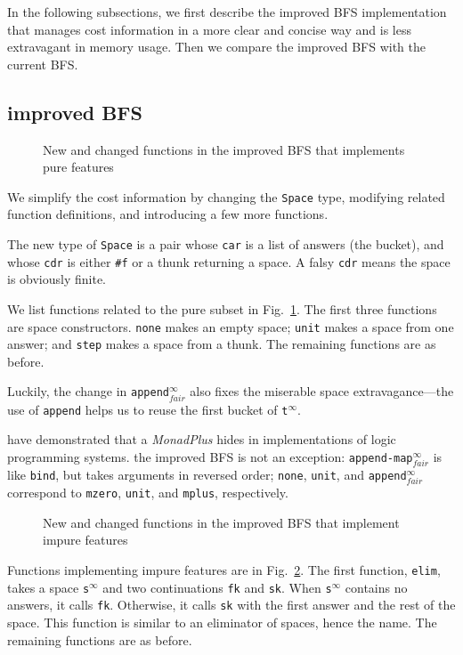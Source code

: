 \documentclass[format=acmlarge, review=true, authordraft=true]{acmart}
\newcommand{\appendInfFair}{\texttt{append$^\infty_{fair}$}}
\newcommand{\appendMapInfFair}{\texttt{append-map$^\infty_{fair}$}}
\newcommand{\sInf}{\texttt{s$^\infty$}}
\newcommand{\tInf}{\texttt{t$^\infty$}}
\newcommand{\BFSser}[0]{the current BFS}
\newcommand{\BFSimp}[0]{the improved BFS}
\begin{document}
In the following subsections, we first describe \BFSimp{} implementation that 
manages cost information in a more clear and concise way and is less 
extravagant in memory usage. Then we compare \BFSimp{} with \BFSser{}.

\subsection{improved BFS}

\begin{figure}
		
	\caption{New and changed functions in \BFSimp{} that implements pure 
	features}
	\label{BFSimp}
\end{figure}

We simplify the cost information by changing the \texttt{Space} type, 
modifying related function definitions, and introducing a few more functions.

The new type of \texttt{Space} is a pair whose \texttt{car} is a list of 
answers (the bucket), and whose \texttt{cdr} is either \texttt{\#{}f} or a 
thunk returning a space. A falsy \texttt{cdr} means the space is obviously 
finite. 

We list functions related to the pure subset in Fig.~\ref{BFSimp}. The first 
three functions are space constructors. \texttt{none} makes an empty space; 
\texttt{unit} makes a space from one answer; and \texttt{step} makes a space 
from a thunk. The remaining functions are as before. 

Luckily, the change in \appendInfFair{} also fixes the miserable space 
extravagance---the use of \texttt{append} helps us to reuse the first 
bucket of \tInf{}.

\citet{kiselyov2005backtracking} have demonstrated that a \emph{MonadPlus} 
hides in implementations of logic programming systems. \BFSimp{} is not an 
exception: \appendMapInfFair{} is like \texttt{bind}, but takes 
arguments in reversed order; \texttt{none}, \texttt{unit}, and 
\appendInfFair{} correspond to \texttt{mzero}, \texttt{unit}, and 
\texttt{mplus}, respectively.

\begin{figure}
		
	\caption{New and changed functions in \BFSimp{} that implement impure 
		features}
	\label{BFSimp-cont}
\end{figure}

Functions implementing impure features are in Fig.~\ref{BFSimp-cont}. The 
first function, \texttt{elim}, takes a space \sInf{} and two 
continuations \texttt{fk} and \texttt{sk}. When \sInf{} contains 
no answers, it calls \texttt{fk}. Otherwise, it calls 
\texttt{sk} with the first answer and the rest of the space. This function is 
similar to an eliminator of spaces, hence the name. The remaining 
functions are as before.
\end{document}
